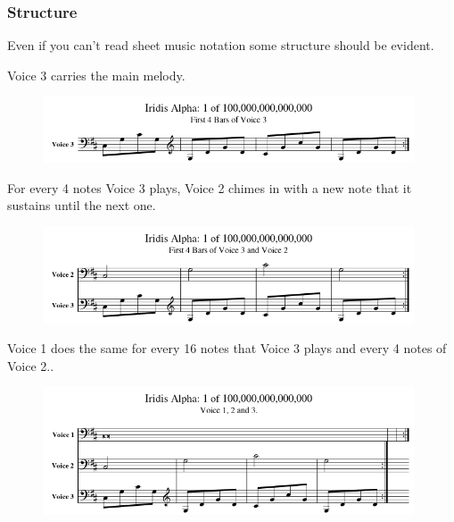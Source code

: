 \subsubsection{Structure}
Even if you can't read sheet music notation some structure should be evident.

Voice 3 carries the main melody. 

\begin{figure}[H]
{
  \begin{adjustbox}{width=11cm,center}
  \includegraphics[width=11cm]{music/Voice_3_Part.png}%
    \end{adjustbox}
}
\end{figure}

For every 4 notes Voice 3 plays, Voice 2 chimes in with a new note that it sustains until the next one.

\begin{figure}[H]
{
  \begin{adjustbox}{width=11cm,center}
  \includegraphics[width=11cm]{music/Voice_2_Part.png}%
    \end{adjustbox}
}
\end{figure}

Voice 1 does the same for every 16 notes that Voice 3 plays and every 4 notes of Voice 2..

\begin{figure}[H]
{
  \begin{adjustbox}{width=11cm,center}
  \includegraphics[width=11cm]{music/Voice_1_Part.png}%
    \end{adjustbox}
}
\end{figure}

